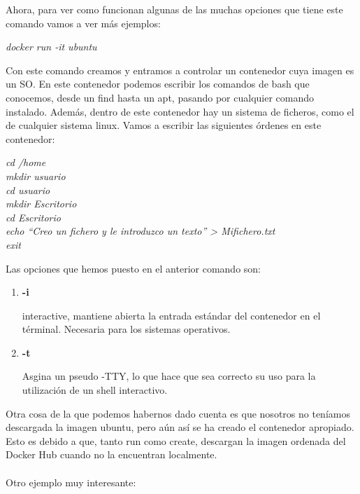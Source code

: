 \documentclass[]{article}
\begin{document}
Ahora, para ver como funcionan algunas de las muchas opciones que tiene este comando vamos a ver más ejemplos:

\begin{center}

	\it	docker run -it ubuntu
	
\end{center}

Con este comando creamos y entramos a controlar un contenedor cuya imagen es un SO. En este contenedor podemos escribir los comandos de bash que conocemos, desde un find hasta un apt, pasando por cualquier comando instalado. Además, dentro de este contenedor hay un sistema de ficheros, como el de cualquier sistema linux. Vamos a escribir las siguientes órdenes en este contenedor:
\begin{center}
	
	\it
	cd /home\\
	mkdir usuario\\
	cd usuario\\
	mkdir Escritorio\\
	cd Escritorio\\
	echo ``Creo un fichero y le introduzco un texto'' > Mifichero.txt\\
	exit

\end{center}
Las opciones que hemos puesto en el anterior comando son:
\begin{enumerate}
\renewcommand{\labelenumi}{$ \bullet $}

\item {\bf -i}

interactive, mantiene abierta la entrada estándar del contenedor en el términal. Necesaria para los sistemas operativos.
\item {\bf -t}

Asgina un pseudo -TTY, lo que hace que sea correcto su uso para la utilización de un shell interactivo.

\end{enumerate}
Otra cosa de la que podemos habernos dado cuenta es que nosotros no teníamos descargada la imagen ubuntu, pero aún así se ha creado el contenedor apropiado.
Esto es debido a que, tanto run como create, descargan la imagen ordenada del Docker Hub cuando no la encuentran localmente.
\\\\

Otro ejemplo muy interesante:
\end{document}
